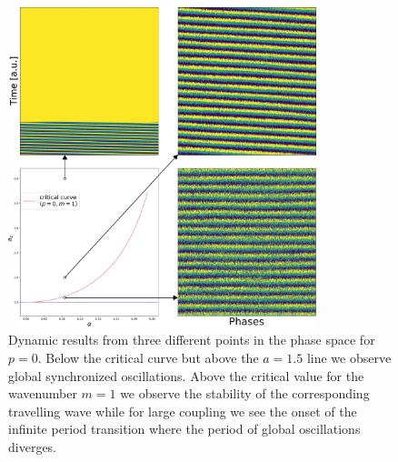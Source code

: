 \begin{figure}
  \centering
  \includegraphics[width=0.8\textwidth]{fig/chap4/crit_plane_sample.png}
	\caption{
		Dynamic results from three different points in the phase space for $p=0$. Below the critical curve but above the $a=1.5$ line we
		observe global synchronized oscillations. Above the critical value for the wavenumber $m=1$ we observe the stability of the
		corresponding travelling wave while for large coupling we see the onset of the infinite period transition where the period of
		global oscillations diverges.
  }
	\label{fig:critical_plane_sample}
\end{figure}

